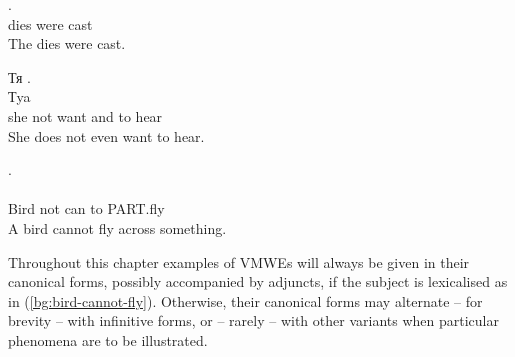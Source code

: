 \documentclass[output=paper,modfonts]{langscibook}
\begin{document}
\ea \label{pl:kosci-zostaly-rzucone}
\settowidth {} 
\gll {}  .\\
dies were cast \\ 
\glt The dies were cast. 
\z

\ea \label{bg:not-want-hear}
\settowidth {} 
\glll Тя     . \\
Тya      \\
she  not want and to hear \\ 
\glt She does not even want to hear. 
\z

\ea \label{bg:bird-cannot-fly}
\settowidth {} 
\glll {}    .\\
     \\
{Bird} {not} {can} {to} {\textsc{PART}.fly} \\ 
\glt A bird cannot fly across something. 
\z

Throughout this chapter examples of VMWEs will always be given in their canonical forms, possibly accompanied by adjuncts, if the subject is lexicalised as in (\ref{bg:bird-cannot-fly}).
Otherwise, their canonical forms may alternate -- for brevity -- with infinitive forms, or -- rarely -- with other variants when particular phenomena are to be illustrated.


\end{document}
